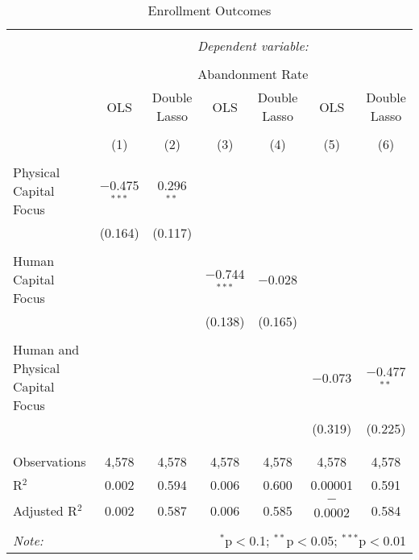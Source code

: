 
\begin{table}[!htbp] \centering 
  \caption{Enrollment Outcomes} 
  \label{} 
\begin{tabular}{@{\extracolsep{5pt}}lcccccc} 
\\[-1.8ex]\hline 
\hline \\[-1.8ex] 
 & \multicolumn{6}{c}{\textit{Dependent variable:}} \\ 
\cline{2-7} 
\\[-1.8ex] & \multicolumn{6}{c}{Abandonment Rate} \\ 
 & OLS & Double Lasso & OLS & Double Lasso & OLS & Double Lasso \\ 
\\[-1.8ex] & (1) & (2) & (3) & (4) & (5) & (6)\\ 
\hline \\[-1.8ex] 
 Physical Capital Focus & $-$0.475$^{***}$ & 0.296$^{**}$ &  &  &  &  \\ 
  & (0.164) & (0.117) &  &  &  &  \\ 
  & & & & & & \\ 
 Human Capital Focus &  &  & $-$0.744$^{***}$ & $-$0.028 &  &  \\ 
  &  &  & (0.138) & (0.165) &  &  \\ 
  & & & & & & \\ 
 Human and Physical Capital Focus &  &  &  &  & $-$0.073 & $-$0.477$^{**}$ \\ 
  &  &  &  &  & (0.319) & (0.225) \\ 
  & & & & & & \\ 
\hline \\[-1.8ex] 
Observations & 4,578 & 4,578 & 4,578 & 4,578 & 4,578 & 4,578 \\ 
R$^{2}$ & 0.002 & 0.594 & 0.006 & 0.600 & 0.00001 & 0.591 \\ 
Adjusted R$^{2}$ & 0.002 & 0.587 & 0.006 & 0.585 & $-$0.0002 & 0.584 \\ 
\hline 
\hline \\[-1.8ex] 
\textit{Note:}  & \multicolumn{6}{r}{$^{*}$p$<$0.1; $^{**}$p$<$0.05; $^{***}$p$<$0.01} \\ 
\end{tabular} 
\end{table} 
